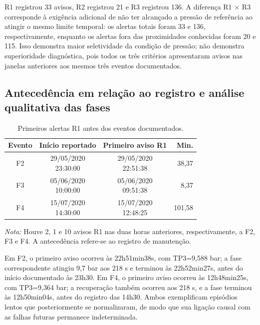 \documentclass[conference]{IEEEtran}
\begin{document}
R1 registrou 33 avisos, R2 registrou 21 e R3 registrou 136. A diferença R1 $\times$ R3 corresponde à exigência adicional de não ter alcançado a pressão de referência ao atingir o mesmo limite temporal: os alertas totais foram 33 e 136, respectivamente, enquanto os alertas fora das proximidades conhecidas foram 20 e 115. Isso demonstra maior seletividade da condição de pressão; não demonstra superioridade diagnóstica, pois todos os três critérios apresentaram avisos nas janelas anteriores aos mesmos três eventos documentados.

\subsection{Antecedência em relação ao registro e análise qualitativa das fases}

\begin{table}[!t]
\centering
\caption{Primeiros alertas R1 antes dos eventos documentados.}
\label{tab:3}
\footnotesize
\setlength{\tabcolsep}{3pt}
\renewcommand{\arraystretch}{1.15}
\begin{tabular}{@{}c c c r@{}}
\toprule
\textbf{Evento} & \textbf{Início reportado} & \textbf{Primeiro aviso R1} & \textbf{Min.} \\
\midrule
F2 & \shortstack{29/05/2020\\23:30:00} & \shortstack{29/05/2020\\22:51:38} & 38,37 \\
F3 & \shortstack{05/06/2020\\10:00:00} & \shortstack{05/06/2020\\09:51:38} & 8,37 \\
F4 & \shortstack{15/07/2020\\14:30:00} & \shortstack{15/07/2020\\12:48:25} & 101,58 \\
\bottomrule
\end{tabular}
\vspace{2pt}
\parbox{\columnwidth}{\raggedright\scriptsize\textit{Nota:} Houve 2, 1 e 10 avisos R1 nas duas horas anteriores, respectivamente, a F2, F3 e F4. A antecedência refere-se ao registro de manutenção.}
\end{table}

Em F2, o primeiro aviso ocorreu às 22h51min38s, com TP3=9,588 bar; a fase correspondente atingiu 9,7 bar aos 218 s e terminou às 22h52min27s, antes do início documentado às 23h30. Em F4, o primeiro aviso ocorreu às 12h48min25s, com TP3=9,364 bar; a recuperação também ocorreu aos 218 s, e a fase terminou às 12h50min04s, antes do registro das 14h30. Ambos exemplificam episódios lentos que posteriormente se normalizaram, de modo que sua ligação causal com as falhas futuras permanece indeterminada.
\end{document}
